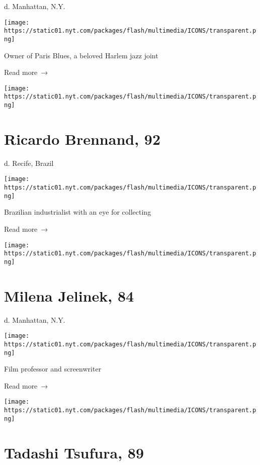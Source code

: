 d. Manhattan, N.Y.

\texttt{[image: https://static01.nyt.com/packages/flash/multimedia/ICONS/transparent.png]}

Owner of Paris Blues, a beloved Harlem jazz joint

 Read more~→

\href{https://www.nytimes.com/2020/04/29/obituaries/ricardo-brennand-dead-coronavirus.html}{}

\texttt{[image: https://static01.nyt.com/packages/flash/multimedia/ICONS/transparent.png]}

\hypertarget{ricardo-brennand-92}{%
\section{Ricardo Brennand, 92}\label{ricardo-brennand-92}}

d. Recife, Brazil

\texttt{[image: https://static01.nyt.com/packages/flash/multimedia/ICONS/transparent.png]}

Brazilian industrialist with an eye for collecting

 Read more~→

\href{https://www.nytimes.com/2020/04/29/movies/milena-jelinek-dead-coronavirus.html}{}

\texttt{[image: https://static01.nyt.com/packages/flash/multimedia/ICONS/transparent.png]}

\hypertarget{milena-jelinek-84}{%
\section{Milena Jelinek, 84}\label{milena-jelinek-84}}

d. Manhattan, N.Y.

\texttt{[image: https://static01.nyt.com/packages/flash/multimedia/ICONS/transparent.png]}

Film professor and screenwriter

 Read more~→

\href{https://www.nytimes.com/2020/04/29/obituaries/tadashi-tsufura-dead-coronavirus.html}{}

\texttt{[image: https://static01.nyt.com/packages/flash/multimedia/ICONS/transparent.png]}

\hypertarget{tadashi-tsufura-89}{%
\section{Tadashi Tsufura, 89}\label{tadashi-tsufura-89}}

